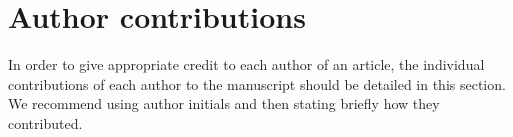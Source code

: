 \section*{Author contributions}
In order to give appropriate credit to each author of an article, the individual contributions of each author to the manuscript should be detailed in this section. We recommend using author initials and then stating briefly how they contributed.